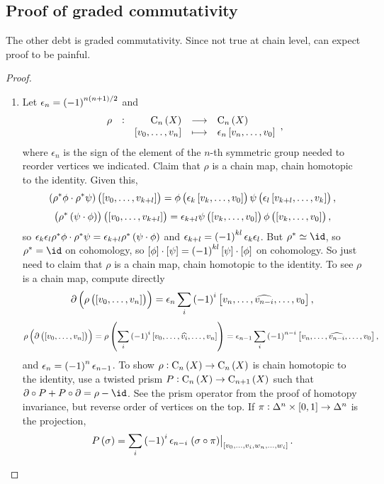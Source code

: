 \pagebreak

\subsection{Proof of graded commutativity}

The other debt is graded commutativity. Since not true at chain level, can expect proof to be painful.

\begin{proof}
\hfill
\begin{enumerate}[leftmargin=0.5in, label=Sketch \arabic*.]
\item Let $ \epsilon_n = \br{-1}^{n\br{n + 1} / 2} $ and
$$ \function[\rho]{\C_n\br{X}}{\C_n\br{X}}{\sbr{v_0, \dots, v_n}}{\epsilon_n\sbr{v_n, \dots, v_0}}, $$
where $ \epsilon_n $ is the sign of the element of the $ n $-th symmetric group needed to reorder vertices we indicated. Claim that $ \rho $ is a chain map, chain homotopic to the identity. Given this,
$$ \br{\rho^*\phi \cdot \rho^*\psi}\br{\sbr{v_0, \dots, v_{k + l}}} = \phi\br{\epsilon_k\sbr{v_k, \dots, v_0}}\psi\br{\epsilon_l\sbr{v_{k + l}, \dots, v_k}}, $$
$$ \br{\rho^*\br{\psi \cdot \phi}}\br{\sbr{v_0, \dots, v_{k + l}}} = \epsilon_{k + l}\psi\br{\sbr{v_k, \dots, v_0}}\phi\br{\sbr{v_k, \dots, v_0}}, $$
so $ \epsilon_k\epsilon_l\rho^*\phi \cdot \rho^*\psi = \epsilon_{k + l}\rho^*\br{\psi \cdot \phi} $ and $ \epsilon_{k + l} = \br{-1}^{kl}\epsilon_k\epsilon_l $. But $ \rho^* \simeq \id $, so $ \rho^* = \id $ on cohomology, so $ \sbr{\phi} \cdot \sbr{\psi} = \br{-1}^{kl}\sbr{\psi} \cdot \sbr{\phi} $ on cohomology. So just need to claim that $ \rho $ is a chain map, chain homotopic to the identity. To see $ \rho $ is a chain map, compute directly
$$ \da\br{\rho\br{\sbr{v_0, \dots, v_n}}} = \epsilon_n\sum_i \br{-1}^i\sbr{v_n, \dots, \widehat{v_{n - i}}, \dots, v_0}, $$
$$ \rho\br{\da\br{\sbr{v_0, \dots, v_n}}} = \rho\br{\sum_i \br{-1}^i\sbr{v_0, \dots, \widehat{v_i}, \dots, v_n}} = \epsilon_{n - 1}\sum_i \br{-1}^{n - i}\sbr{v_n, \dots, \widehat{v_{n - i}}, \dots, v_0}, $$
and $ \epsilon_n = \br{-1}^n\epsilon_{n - 1} $. To show $ \rho : \C_n\br{X} \to \C_n\br{X} $ is chain homotopic to the identity, use a twisted prism $ P : \C_n\br{X} \to \C_{n + 1}\br{X} $ such that $ \da \circ P + P \circ \da = \rho - \id $. See the prism operator from the proof of homotopy invariance, but reverse order of vertices on the top. If $ \pi : \Delta^n \times \sbr{0, 1} \to \Delta^n $ is the projection,
$$ P\br{\sigma} = \sum_i \br{-1}^i\epsilon_{n - i}\eval{\br{\sigma \circ \pi}}_{\sbr{v_0, \dots, v_i, w_n, \dots, w_i}}. $$

\end{enumerate}
\end{proof}
